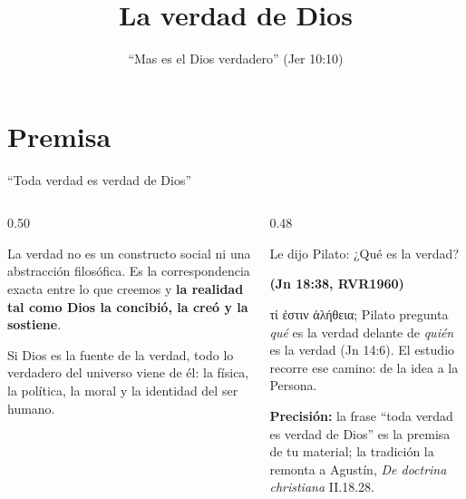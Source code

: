 \documentclass[hyperref={bookmarks=false},aspectratio=169]{beamer}
\title[La verdad]{\bfseries{La verdad de Dios}}
\subtitle{``Mas \SENOR{} es el Dios verdadero'' (Jer 10:10)}
\author{}\institute{}\date{}
\newcommand{\grc}[1]{\foreignlanguage{ancientgreek}{#1}}
\newcommand{\fuente}[1]{\par\hfill{\upshape\bfseries\footnotesize\textcolor{azul}{#1}}}
\newcommand{\destacar}[1]{\textbf{\textcolor{azul}{#1}}}
\newcommand{\precision}[1]{{\footnotesize\color{gris}\textbf{Precisión:} #1}}
\begin{document}
\frame{\titlepage}


\section{Premisa}

\begin{frame}{``Toda verdad es verdad de Dios''}
\begin{columns}[c,onlytextwidth]
\begin{column}{0.50\textwidth}
\begin{tcolorbox}[colback=papiro,colframe=dorado,boxrule=1.2pt,arc=3pt]
\centering\small La verdad no es un constructo social ni una abstracción filosófica. Es la correspondencia exacta entre lo que creemos y \destacar{la realidad tal como Dios la concibió, la creó y la sostiene}.
\end{tcolorbox}
\small\RaggedRight Si Dios es la fuente de la verdad, todo lo verdadero del universo viene de él: la física, la política, la moral y la identidad del ser humano.
\end{column}
\begin{column}{0.48\textwidth}
\begin{cita}Le dijo Pilato: ¿Qué es la verdad?\fuente{(Jn 18:38, RVR1960)}\end{cita}
\scriptsize\grc{τί ἐστιν ἀλήθεια;} Pilato pregunta \emph{qué} es la verdad delante de \emph{quién} es la verdad (Jn 14:6). El estudio recorre ese camino: de la idea a la Persona.\par\smallskip
\precision{la frase ``toda verdad es verdad de Dios'' es la premisa de tu material; la tradición la remonta a Agustín, \emph{De doctrina christiana} II.18.28.}
\end{column}
\end{columns}
\end{frame}
\end{document}
